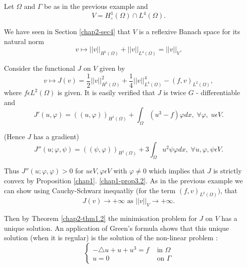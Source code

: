 \begin{example}\label{chap2-exam5.4}
Let $\Omega$ and $\Gamma$ be as in the previous example and
\begin{equation*}
V = H_{\circ}^{1} (\Omega) \cap L^{4} (\Omega).\tag{5.41}\label{chap2-eq5.41}
\end{equation*}

We have seen in Section \ref{chap2-sec4} that $V$ is a reflexive Banach space for its natural norm
\begin{equation*}
v \mapsto ||v||_{H^{1} (\Omega)} + ||v||_{L^{4} (\Omega)} = ||v||_{V}.\tag{5.42}\label{chap2-eq5.42}
\end{equation*}
\end{example}

Consider the functional $J$ on $V$ given by
\begin{equation*}
v \mapsto J(v) = \frac{1}{2} ||v||^{2}_{H^{1} (\Omega)} + \dfrac{1}{4} ||v||_{L^{4}(\Omega)}^{4} - (f, v)_{L^{2} (\Omega)},\tag{5.43}\label{chap2-eq5.43}
\end{equation*}\pageoriginale
where $f \epsilon L^{2} (\Omega)$ is given. It is easily verified that
$J$ is twice $G$ - differentiable and
$$
J'(u, \varphi) = ((u, \varphi))_{H^{1} (\Omega)} +  \int_{\Omega} (u^{3} - f) \varphi dx, \; \forall \varphi, \; u \epsilon V.
$$

(Hence $J$ has a gradient)
$$
J''(u ; \varphi, \psi) = ((\psi, \varphi))_{H^{1} (\Omega)}  + 3 \int_{\Omega} u^{2} \psi \varphi dx, \; \forall u, \varphi, \psi \epsilon V.
$$

Thus $J'' (u ; \varphi, \varphi) > 0$ for $u \epsilon V, \varphi \epsilon V$ with $\varphi \neq 0$ which implies that $J$ is strictly convex by Proposition \ref{chap1}. \ref{chap1-prop3.2}. As in the previous example we can show using Cauchy-Schwarz inequatliy (for the term $(f, v)_{L^{2} (\Omega)})$, that
$$
J(v) \to +\infty \text{ as } ||v||_{V} \to +\infty.
$$

Then by Theorem \ref{chap2-thm1.2} the minimisation problem for $J$ on $V$ has a unique solution. An application of Green's formula shows that this unique solution (when it is regular) is the solution of the non-linear problem :
\begin{equation*}
\begin{cases}
-\triangle u + u + u^{3} = f & \text{ in } \Omega\\
u = 0 & \text{ on } \Gamma\tag{5.44}\label{chap2-eq5.44}
\end{cases}
\end{equation*}

